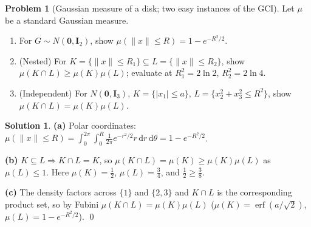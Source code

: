 \documentclass[12pt,a4paper]{article}
\theoremstyle{definition}
\newtheorem{exercise}{Problem}
\newtheorem*{solution*}{Solution}
\DeclareMathOperator\erf{erf}
\newcommand{\dd}{\mathrm{d}}
\newcommand{\bI}{\mathbf{I}}
\newcommand{\bzero}{\mathbf{0}}
\newcommand{\norm}[1]{\lVert #1 \rVert}
\begin{document}
\begin{exercise}[Gaussian measure of a disk; two easy instances of the GCI]\label{prob:disk}
Let $\mu$ be a standard Gaussian measure.
\begin{enumerate}[label=(\alph*)]
\item For $G\sim N(\bzero,\bI_2)$, show $\mu(\norm{x}\le R)=1-e^{-R^2/2}$.
\item (Nested) For $K=\{\norm{x}\le R_1\}\subseteq L=\{\norm{x}\le R_2\}$, show $\mu(K\cap L)\ge\mu(K)\mu(L)$; evaluate at $R_1^2=2\ln2$, $R_2^2=2\ln4$.
\item (Independent) For $N(\bzero,\bI_3)$, $K=\{|x_1|\le a\}$, $L=\{x_2^2+x_3^2\le R^2\}$, show $\mu(K\cap L)=\mu(K)\mu(L)$.
\end{enumerate}
\end{exercise}
\begin{solution*}
\textbf{(a)} Polar coordinates: $\mu(\norm x\le R)=\int_0^{2\pi}\!\int_0^R\tfrac1{2\pi}e^{-r^2/2}r\,\dd r\,\dd\theta=1-e^{-R^2/2}$.

\textbf{(b)} $K\subseteq L\Rightarrow K\cap L=K$, so $\mu(K\cap L)=\mu(K)\ge\mu(K)\mu(L)$ as $\mu(L)\le1$. Here $\mu(K)=\tfrac12$, $\mu(L)=\tfrac34$, and $\tfrac12\ge\tfrac38$.

\textbf{(c)} The density factors across $\{1\}$ and $\{2,3\}$ and $K\cap L$ is the corresponding product set, so by Fubini $\mu(K\cap L)=\mu(K)\mu(L)$ ($\mu(K)=\erf(a/\sqrt2)$, $\mu(L)=1-e^{-R^2/2}$). \qed
\end{solution*}
\end{document}
